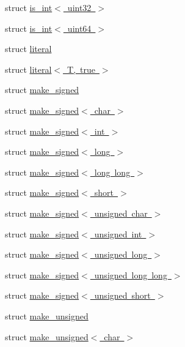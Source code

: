 \begin{DoxyCompactItemize}
\item 
struct \mbox{\hyperlink{structglm_1_1detail_1_1is__int_3_01uint32_01_4}{is\+\_\+int$<$ uint32 $>$}}
\item 
struct \mbox{\hyperlink{structglm_1_1detail_1_1is__int_3_01uint64_01_4}{is\+\_\+int$<$ uint64 $>$}}
\item 
struct \mbox{\hyperlink{structglm_1_1detail_1_1literal}{literal}}
\item 
struct \mbox{\hyperlink{structglm_1_1detail_1_1literal_3_01_t_00_01true_01_4}{literal$<$ T, true $>$}}
\item 
struct \mbox{\hyperlink{structglm_1_1detail_1_1make__signed}{make\+\_\+signed}}
\item 
struct \mbox{\hyperlink{structglm_1_1detail_1_1make__signed_3_01char_01_4}{make\+\_\+signed$<$ char $>$}}
\item 
struct \mbox{\hyperlink{structglm_1_1detail_1_1make__signed_3_01int_01_4}{make\+\_\+signed$<$ int $>$}}
\item 
struct \mbox{\hyperlink{structglm_1_1detail_1_1make__signed_3_01long_01_4}{make\+\_\+signed$<$ long $>$}}
\item 
struct \mbox{\hyperlink{structglm_1_1detail_1_1make__signed_3_01long_01long_01_4}{make\+\_\+signed$<$ long long $>$}}
\item 
struct \mbox{\hyperlink{structglm_1_1detail_1_1make__signed_3_01short_01_4}{make\+\_\+signed$<$ short $>$}}
\item 
struct \mbox{\hyperlink{structglm_1_1detail_1_1make__signed_3_01unsigned_01char_01_4}{make\+\_\+signed$<$ unsigned char $>$}}
\item 
struct \mbox{\hyperlink{structglm_1_1detail_1_1make__signed_3_01unsigned_01int_01_4}{make\+\_\+signed$<$ unsigned int $>$}}
\item 
struct \mbox{\hyperlink{structglm_1_1detail_1_1make__signed_3_01unsigned_01long_01_4}{make\+\_\+signed$<$ unsigned long $>$}}
\item 
struct \mbox{\hyperlink{structglm_1_1detail_1_1make__signed_3_01unsigned_01long_01long_01_4}{make\+\_\+signed$<$ unsigned long long $>$}}
\item 
struct \mbox{\hyperlink{structglm_1_1detail_1_1make__signed_3_01unsigned_01short_01_4}{make\+\_\+signed$<$ unsigned short $>$}}
\item 
struct \mbox{\hyperlink{structglm_1_1detail_1_1make__unsigned}{make\+\_\+unsigned}}
\item 
struct \mbox{\hyperlink{structglm_1_1detail_1_1make__unsigned_3_01char_01_4}{make\+\_\+unsigned$<$ char $>$}}

\end{DoxyCompactItemize}
